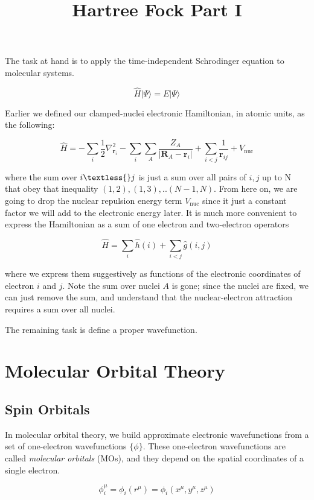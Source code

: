 \documentclass[11pt]{article}
\title{Hartree Fock Part I}
\begin{document}
\maketitle

The task at hand is to apply the time-independent Schrodinger equation to molecular systems.

\[\hat{H} |\Psi \rangle = E |\Psi \rangle \]

Earlier we defined our clamped-nuclei electronic Hamiltonian, in atomic units, as the following:

\[ \hat{H} = -\sum\limits_{i} \frac{1}{2} \nabla^2_{\boldsymbol{r}_i} - \sum\limits_{i} \sum\limits_{A} \frac{Z_A}{|\boldsymbol{R}_A - \boldsymbol{r}_i|} + \sum\limits_{i < j} \frac{1}{\boldsymbol{r}_{ij}} + V_{\mathrm{nuc}} \]

where the sum over $i \textless{} j$ is just a sum over all pairs of
$i,j$ up to N that obey that inequality $(1,2), (1,3), .. (N-1,N)$.
From here on, we are going to drop the nuclear repulsion energy term
$V_{\mathrm{nuc}}$ since it just a constant factor we will add to the
electronic energy later. It is much more convenient to express the Hamiltonian
as a sum of one electron and two-electron operators

\[ \hat{H} = \sum\limits_{i} \hat{h}(i) + \sum\limits_{i < j} \hat{g}(i,j)  \]

where we express them suggestively as functions of the electronic
coordinates of electron \(i\) and \(j\). Note the sum over nuclei \(A\)
is gone; since the nuclei are fixed, we can just remove the sum, and
understand that the nuclear-electron attraction requires a sum over all
nuclei.

The remaining task is define a proper wavefunction.

    
\section{Molecular Orbital Theory}
\subsection{Spin Orbitals}
In molecular orbital theory, we build approximate electronic
wavefunctions from a set of one-electron wavefunctions $\{\phi\}$. These
one-electron wavefunctions are called \emph{molecular orbitals} (MOs),
and they depend on the spatial coordinates of a single electron.

\[ \phi _i ^ \mu = \phi_i(r^\mu) = \phi_i(x^\mu, y^\mu, z^\mu) \]
\end{document}
